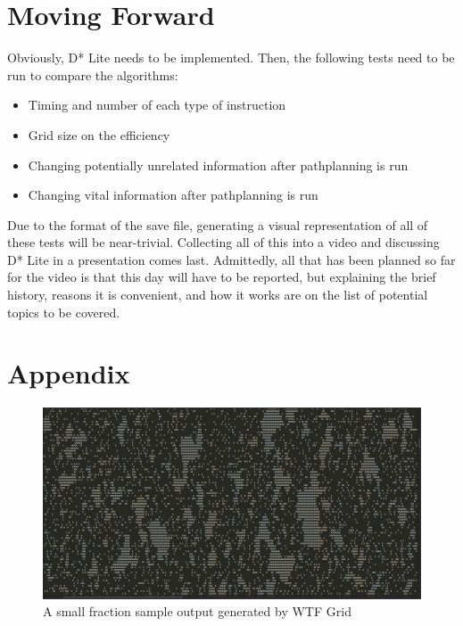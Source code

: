 \documentclass{article}
\begin{document}
\section{Moving Forward}

Obviously, D* Lite needs to be implemented. Then, the following tests need
to be run to compare the algorithms:

\begin{itemize}
    \item Timing and number of each type of instruction
    \item Grid size on the efficiency
    \item Changing potentially unrelated information after pathplanning is run
    \item Changing vital information after pathplanning is run
\end{itemize}

Due to the format of the save file, generating a visual representation of all
of these tests will be near-trivial. Collecting all of this into a video
and discussing D* Lite in a presentation comes last. Admittedly, all that has
been planned so far for the video is that this day will have to be reported,
but explaining the brief history, reasons it is convenient, and how it works
are on the list of potential topics to be covered.

\section*{Appendix}

\begin{figure}[H]
    \includegraphics[scale=0.2]{map}
    \caption{A small fraction sample output generated by WTF Grid}
\end{figure}
\end{document}
